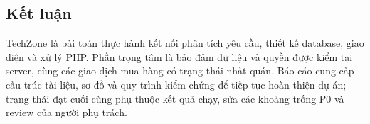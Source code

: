 \subsection{Kết luận}
TechZone là bài toán thực hành kết nối phân tích yêu cầu, thiết kế database, giao diện và xử lý PHP. Phần trọng tâm là bảo đảm dữ liệu và quyền được kiểm tại server, cùng các giao dịch mua hàng có trạng thái nhất quán. Báo cáo cung cấp cấu trúc tài liệu, sơ đồ và quy trình kiểm chứng để tiếp tục hoàn thiện dự án; trạng thái đạt cuối cùng phụ thuộc kết quả chạy, sửa các khoảng trống P0 và review của người phụ trách.
\clearpage
